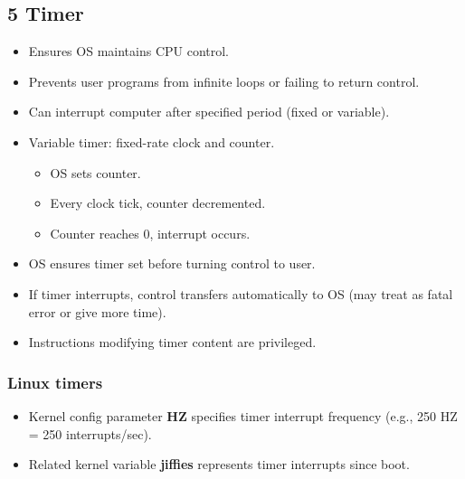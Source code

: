 \documentclass{article}
\begin{document}
\subsection*{5 Timer}
\begin{itemize}
    \item Ensures OS maintains CPU control.
    \item Prevents user programs from infinite loops or failing to return control.
    \item Can interrupt computer after specified period (fixed or variable).
    \item Variable timer: fixed-rate clock and counter.
    \begin{itemize}
        \item OS sets counter.
        \item Every clock tick, counter decremented.
        \item Counter reaches 0, interrupt occurs.
    \end{itemize}
    \item OS ensures timer set before turning control to user.
    \item If timer interrupts, control transfers automatically to OS (may treat as fatal error or give more time).
    \item Instructions modifying timer content are privileged.
\end{itemize}

\subsubsection*{Linux timers}
\begin{itemize}
    \item Kernel config parameter \textbf{HZ} specifies timer interrupt frequency (e.g., 250 HZ = 250 interrupts/sec).
    \item Related kernel variable \textbf{jiffies} represents timer interrupts since boot.
\end{itemize}
\end{document}
